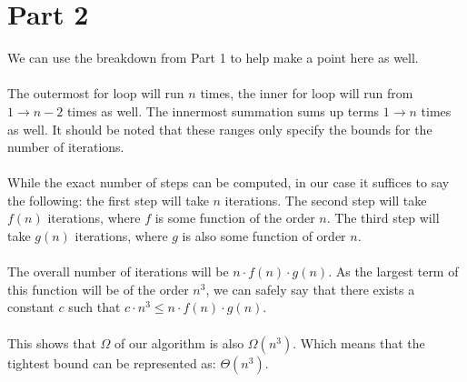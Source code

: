 \documentclass[]{article}
\begin{document}
\section{Part 2}
We can use the breakdown from Part 1 to help make a point here as well. \\ \\
The outermost for loop will run $n$ times, the inner for loop will run from $1 \rightarrow n-2$ times as well. The innermost summation sums up terms $1 \rightarrow n$ times as well. It should be noted that these ranges only specify the bounds for the number of iterations. \\ \\
While the exact number of steps can be computed, in our case it suffices to say the following: the first step will take $n$ iterations. The second step will take $f(n)$ iterations, where $f$ is some function of the order $n$. The third step will take $g(n)$ iterations, where $g$ is also some function of order $n$. \\ \\
The overall number of iterations will be $n \cdot f(n) \cdot g(n)$. As the largest term of this function will be of the order $n^3$, we can safely say that there exists a constant $c$ such that $c \cdot n^3 \leq n \cdot f(n) \cdot g(n)$.\\ \\
This shows that $\Omega$ of our algorithm is also $\Omega(n^3)$. Which means that the tightest bound can be represented as: $\Theta(n^3)$.
\end{document}
